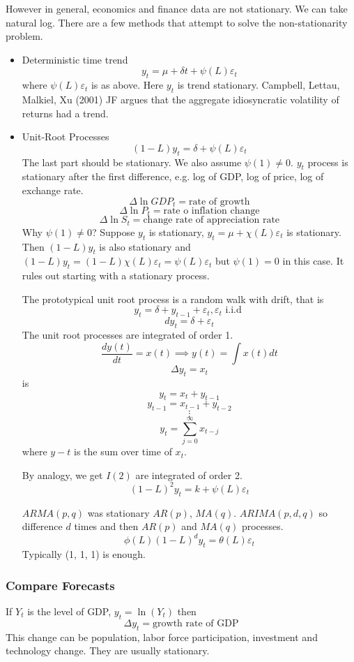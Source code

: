 \documentclass[11pt, a4paper, oneside]{article}
\theoremstyle{definition}
\theoremstyle{proposition}
\theoremstyle{corollary}
\theoremstyle{lemma}
\theoremstyle{theorem}
\begin{document}
However in general, economics and finance data are not stationary. We can take natural log. There are a few methods that attempt to solve the non-stationarity problem.
\begin{itemize}
\item Deterministic time trend
$$y_t = \mu + \delta t + \psi(L)\varepsilon_t$$
where $\psi(L)\varepsilon_t$ is as above. Here $y_t$ is trend stationary. Campbell, Lettau, Malkiel, Xu (2001) JF argues that the aggregate idiosyncratic volatility of returns had a trend. 
\item Unit-Root Processes
$$(1 - L)y_t = \delta + \psi(L)\varepsilon_t$$
The last part should be stationary. We also assume $\psi(1) \neq 0$. 
$y_t$ process is stationary after the first difference, e.g. log of GDP, log of price, log of exchange rate. 
$$\Delta \ln GDP_t = \text{rate of growth}$$
$$\Delta \ln P_t= \text{rate o inflation change}$$
$$\Delta \ln S_t = \text{change rate of appreciation rate}$$
Why $\psi(1) \neq 0$? Suppose $y_t$ is stationary, $y_t = \mu + \chi(L)\varepsilon_t$ is stationary. Then $(1- L)y_t$ is also stationary and $(1-L)y_t = (1 - L)\chi(L) \varepsilon_t = \psi(L)\varepsilon_t$ but $\psi(1) = 0$ in this case. It rules out starting with a stationary process. 

The prototypical unit root process is a random walk with drift, that is
$$y_t = \delta + y_{t-1} + \varepsilon_t, \varepsilon_t \text{ i.i.d }$$
$$d y_t = \delta + \varepsilon_t$$
The unit root processes are integrated of order 1. 
$$\frac{d y(t)}{dt} = x(t) \implies y(t) = \int x(t ) dt$$
$$\Delta y_t = x_t$$ is $$y_t = x_t + y_{t-1}$$
$$y_{t-1} = x_{t-1} + y_{t-2}$$
$$\vdots$$
$$y_t = \sum_{j = 0}^{\infty}x_{t-j}$$
where $y-t$ is the sum over time of $x_t$. 

By analogy, we get $I(2)$ are integrated of order 2. 
$$(1- L)^2y_t = k + \psi(L) \varepsilon_t$$

$ARMA(p, q)$ was stationary $AR(p)$, $MA(q)$. $ARIMA(p, d, q)$ so difference $d$ times and then $AR(p)$ and $MA(q)$ processes. 
$$\phi(L)(1- L)^d y_t = \theta(L)\varepsilon_t$$ Typically (1, 1, 1) is enough. 
\end{itemize}

\subsubsection{Compare Forecasts}
If $Y_t$ is the level of GDP, $y_t = \ln(Y_t)$ then 
$$\Delta y_t = \text{growth rate of GDP}$$ This change can be population, labor force participation, investment and technology change. They are usually stationary. 
\end{document}

